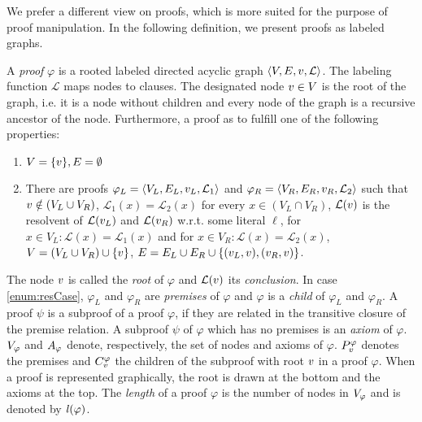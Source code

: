 We prefer a different view on proofs, which is more suited for the purpose of proof manipulation.
In the following definition, we present proofs as labeled graphs.

\begin{definition}[Proof] 
\label{def:proof}
A \emph{proof} $\varphi$ is a rooted labeled directed acyclic graph $\langle V,E,v,\mathcal{L} \rangle$.
The labeling function $\mathcal{L}$ maps nodes to clauses.
The designated node $v \in V$ is the root of the graph, i.e. it is a node without children and every node of the graph is a recursive ancestor of the node.
Furthermore, a proof as to fulfill one of the following properties:

\begin{enumerate}
	\item $V = \{v\}, E = \emptyset$
	\item \label{enum:resCase} 
		There are proofs $\varphi_L = \langle V_L, E_L, v_L,\mathcal{L}_1 \rangle$ and $\varphi_R = \langle V_R, E_R, v_R, \mathcal{L}_2 \rangle$ such that 
		$v \notin (V_L \cup V_R)$, $\mathcal{L}_1(x) = \mathcal{L}_2(x)$ for every $x \in (V_L \cap V_R)$,
		$\mathcal{L}(v)$ is the resolvent of $\mathcal{L}(v_L)$ and $\mathcal{L}(v_R)$ w.r.t. some literal $\ell$,
		for $x \in V_L: \mathcal{L}(x) = \mathcal{L}_1(x)$ and for $x \in V_R: \mathcal{L}(x) = \mathcal{L}_2(x)$,
		$V = (V_L \cup V_R) \cup \{v \}$, $E = E_L \cup E_R \cup \{(v_L,v) , (v_R,v) \}$.
\end{enumerate}

The node $v$ is called the \emph{root} of $\varphi$ and $\mathcal{L}(v)$ its \emph{conclusion}.
In case \ref{enum:resCase}, $\varphi_L$ and $\varphi_R$ are \emph{premises} of $\varphi$ and $\varphi$ is a \emph{child} of $\varphi_L$ and $\varphi_R$.
A proof $\psi$ is a subproof of a proof $\varphi$, if they are related in the transitive closure of the premise relation.
A subproof $\psi$ of $\varphi$ which has no premises is an \emph{axiom} of $\varphi$.
$V_{\varphi}$ and $A_{\varphi}$ denote, respectively, the set of nodes and axioms of $\varphi$. 
$P_{v}^{\varphi}$ denotes the premises and $C_{v}^{\varphi}$ the children of the subproof with root $v$ in a proof $\varphi$. 
When a proof is represented graphically, the root is drawn at the bottom and the axioms at the top. 
The \emph{length} of a proof $\varphi$ is the number of nodes in $V_{\varphi}$ and is denoted by $\mathit{l}(\varphi)$.
\end{definition}

